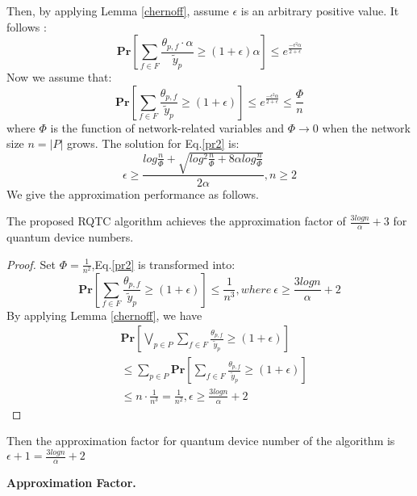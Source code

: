 Then, by applying Lemma \ref{chernoff}, assume $\epsilon$ is an arbitrary positive value. It follows :
\begin{equation}\label{pr1}
  \textbf{Pr}[\sum_{f \in F} \frac{\theta_{p,f} \cdot \alpha}{\widetilde{y}_p} \ge (1+\epsilon)\alpha] \le e^{\frac{-\epsilon^2\alpha}{2+\epsilon}}
\end{equation}
Now we assume that:
\begin{equation}\label{pr2}
  \textbf{Pr}[\sum_{f \in F} \frac{\theta_{p,f}}{\widetilde{y}_p } \ge (1+\epsilon)] \le e^{\frac{-\epsilon^2\alpha}{2+\epsilon}} \le \frac{\Phi}{n}
\end{equation}
where $\Phi$ is the function of network-related variables and $\Phi \rightarrow 0$ when the network size $n = |P|$ grows. The solution for Eq.\ref{pr2} is:
\begin{equation}\label{solution}
  \epsilon \ge \frac{log\frac{n}{\Phi}+\sqrt{log^2\frac{n}{\Phi}+8\alpha log\frac{n}{\Phi}}}{2\alpha},n \ge 2
\end{equation}
We give the approximation performance as follows.
\begin{theorem}
The proposed RQTC algorithm achieves the approximation factor of $\frac{3logn}{\alpha}+3$ for quantum device numbers.
\end{theorem}
\begin{proof}
Set $\Phi = \frac{1}{n^2}$,Eq.\ref{pr2} is transformed into:
\begin{equation}
    \textbf{Pr}[\sum_{f \in F} \frac{\theta_{p,f}}{\widetilde{y}_p } \ge (1+\epsilon)] \le \frac{1}{n^3},where \ \epsilon \ge \frac{3logn}{\alpha}+2
\end{equation}
By applying Lemma \ref{chernoff}, we have
\begin{equation}
\begin{aligned}
    &\textbf{Pr}[\bigvee_{p \in P}\sum_{f \in F} \frac{\theta_{p,f}}{\widetilde{y}_p} \ge (1+\epsilon)]\\ &\le \sum_{p \in P}\textbf{Pr}[\sum_{f \in F} \frac{\theta_{p,f}}{\widetilde{y}_p } \ge (1+\epsilon)]\\
    &\le n\cdot \frac{1}{n^3} = \frac{1}{n^2}, \epsilon \ge \frac{3logn}{\alpha}+2
\end{aligned}
\end{equation}
\end{proof}

Then the approximation factor for quantum device number of the algorithm is $\epsilon + 1 = \frac{3logn}{\alpha}+2$


\textbf{Approximation Factor.}



